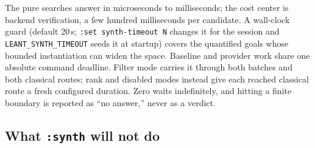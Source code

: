 \documentclass[11pt,oneside]{article}
\newcommand{\code}[1]{\texttt{#1}}
\begin{document}
The pure searches answer in microseconds to milliseconds; the cost
center is backend verification, a few hundred milliseconds per
candidate. A wall-clock guard (default 20\,s; \code{:set synth-timeout N}
changes it for the session and \code{LEANT\_SYNTH\_TIMEOUT} seeds it at
startup) covers the quantified goals whose
bounded instantiation can widen the space. Baseline and provider work share one
absolute command deadline. Filter mode carries it through both batches and
both classical routes; rank and disabled modes instead give each reached
classical route a fresh configured duration. Zero waits indefinitely, and
hitting a finite boundary is reported as ``no answer,'' never as a verdict.

\subsection{What \code{:synth} will not do}\label{sec:limits}
\end{document}
